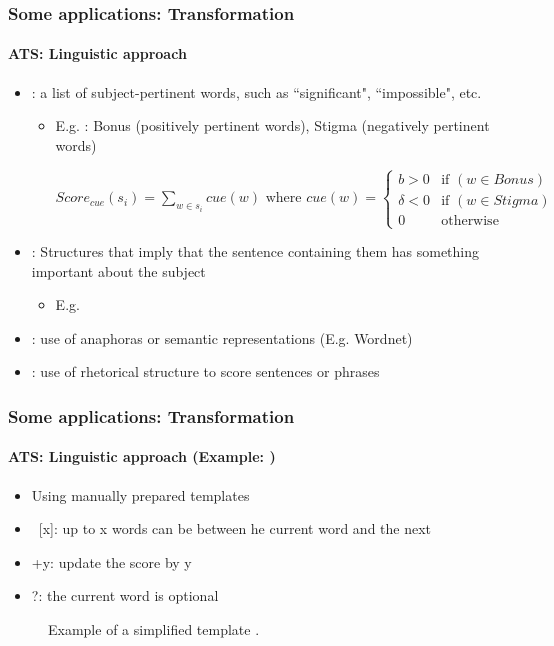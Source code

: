 \documentclass[xcolor=table]{beamer}
\begin{document}
\begin{frame}
	\frametitle{Some applications: Transformation}
	\framesubtitle{ATS: Linguistic approach}
	
	\begin{itemize}
		\item {}: a list of subject-pertinent words, such as ``significant", ``impossible", etc.
		\begin{itemize}
			\item E.g. \cite{69-edmundson}: Bonus (positively pertinent words), Stigma (negatively pertinent words)
			
			$Score_{cue}(s_i) = \sum_{w \in s_i}{cue(w)}
			\text{ where }
			cue(w) = \left\lbrace 
			\begin{array}{ll}
			b > 0 & \text{if } (w \in Bonus) \\
			\delta < 0 & \text{if } (w \in Stigma) \\
			0 & \text{otherwise} 
			\end{array} 
			\right. $
		\end{itemize}
		\item {}: Structures that imply that the sentence containing them has something important about the subject
		\begin{itemize}
			\item E.g. 
		\end{itemize}
		\item {}: use of anaphoras or semantic representations (E.g. Wordnet)
		\item {}: use of rhetorical structure to score sentences or phrases
	\end{itemize}
	
\end{frame}

\begin{frame}
	\frametitle{Some applications: Transformation}
	\framesubtitle{ATS: Linguistic approach (Example: \cite{81-paice})}
	
	\begin{itemize}
		\item Using manually prepared templates
		\item\ [x]: up to x words can be between he current word and the next
		\item +y: update the score by y
		\item ?: the current word is optional
	\end{itemize}

	\begin{figure}[!ht]
		\begin{center}
			\caption{Example of a simplified template \cite{81-paice}.}
			\label{fig:paice-template}
		\end{center}
	\end{figure}
	
\end{frame}
\end{document}
